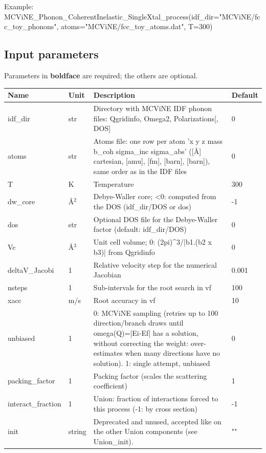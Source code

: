 Example: MCViNE\_Phonon\_CoherentInelastic\_SingleXtal\_process(idf\_dir="MCViNE/fcc\_toy\_phonons", atoms="MCViNE/fcc\_toy\_atoms.dat", T=300)

\subsection*{Input parameters}
Parameters in \textbf{boldface} are required; the others are optional.

\begin{longtable}{p{}p{}p{}p{}}
\toprule
\textbf{Name} & \textbf{Unit} & \textbf{Description} & \textbf{Default} \\
\midrule
\endhead
idf\_dir & str & Directory with MCViNE IDF phonon files: Qgridinfo, Omega2, Polarizations[, DOS] & 0 \\
atoms & str & Atoms file: one row per atom 'x y z mass b\_coh sigma\_inc sigma\_abs' ([\AA{}] cartesian, [amu], [fm], [barn], [barn]), same order as in the IDF files & 0 \\
T & K & Temperature & 300 \\
dw\_core & \AA{}$^{2}$ & Debye-Waller core; \textless{}0: computed from the DOS (idf\_dir/DOS or dos) & -1 \\
dos & str & Optional DOS file for the Debye-Waller factor (default: idf\_dir/DOS) & 0 \\
Vc & \AA{}$^{3}$ & Unit cell volume; 0: (2pi)\textasciicircum{}3/|b1.(b2 x b3)| from Qgridinfo & 0 \\
deltaV\_Jacobi & 1 & Relative velocity step for the numerical Jacobian & 0.001 \\
nsteps & 1 & Sub-intervals for the root search in vf & 100 \\
xacc & m/s & Root accuracy in vf & 10 \\
unbiased & 1 & 0: MCViNE sampling (retries up to 100 direction/branch draws until omega(Q)=|Ei-Ef| has a solution, without correcting the weight: over-estimates when many directions have no solution). 1: single attempt, unbiased & 0 \\
packing\_factor & 1 & Packing factor (scales the scattering coefficient) & 1 \\
interact\_fraction & 1 & Union: fraction of interactions forced to this process (-1: by cross section) & -1 \\
init & string & Deprecated and unused, accepted like on the other Union components (see Union\_init). & "" \\
\bottomrule
\end{longtable}

